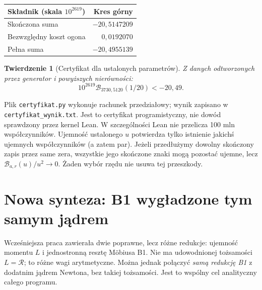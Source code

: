 \documentclass[11pt,a4paper]{article}
\newtheorem{tw}{Twierdzenie}[section]
\theoremstyle{definition}\newtheorem{defn}[tw]{Definicja}
\theoremstyle{remark}\newtheorem*{uw}{Uwaga}
\newcommand{\R}{\mathcal R}
\newcommand{\B}{\mathcal B}
\begin{document}
\begin{center}
\begin{tabular}{lr}
\toprule Składnik (skala $10^{2619}$)&Kres górny\\\midrule
Skończona suma&$-20{,}5147209$\\
Bezwzględny koszt ogona&$0{,}0192070$\\\midrule
Pełna suma&$-20{,}4955139$\\\bottomrule
\end{tabular}
\end{center}
\begin{tw}[Certyfikat dla ustalonych parametrów]
Z danych odtworzonych przez generator i powyższych nierówności:
\[
 \boxed{10^{2619}\B_{3730,5120}(1/20)<-20{,}49.}
\]
\end{tw}
Plik \texttt{certyfikat.py} wykonuje rachunek przedziałowy; wynik zapisano
w \texttt{certyfikat\_wynik.txt}. Jest to certyfikat programistyczny,
nie dowód sprawdzony przez kernel Lean. W szczególności Lean nie przelicza
100 mln współczynników. Ujemność ustalonego $u$ potwierdza tylko istnienie
jakichś ujemnych współczynników (a zatem par). Jeżeli przedłużymy dowolny
skończony zapis przez same zera, wszystkie jego skończone znaki mogą pozostać
ujemne, lecz $\B_{a,r}(u)/u^2\to0$. Żaden wybór rzędu nie usuwa tej przeszkody.

\section{Nowa synteza: B1 wygładzone tym samym jądrem}\label{sec:smooth}
Wcześniejsza praca zawierała dwie poprawne, lecz różne redukcje:
ujemność momentu $L$ i jednostronną resztę Möbiusa B1. Nie ma udowodnionej
tożsamości $L=\R$; to różne wagi arytmetyczne. Można jednak połączyć
\emph{samą redukcję B1} z dodatnim jądrem Newtona, bez takiej tożsamości.
Jest to wspólny cel analityczny całego programu.
\end{document}
